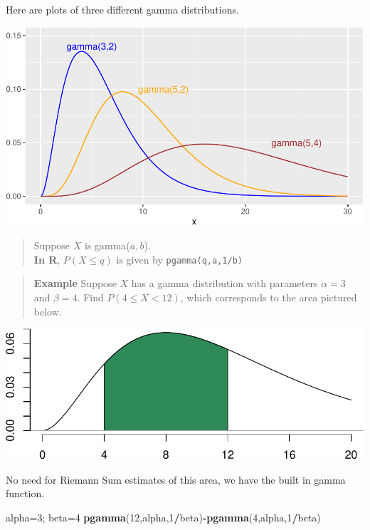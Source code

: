 \documentclass[
]{book}
\newenvironment{Shaded}{\begin{snugshade}}{\end{snugshade}}
\newcommand{\DecValTok}[1]{\textcolor[rgb]{0.00,0.00,0.81}{#1}}
\newcommand{\FunctionTok}[1]{\textcolor[rgb]{0.13,0.29,0.53}{\textbf{#1}}}
\newcommand{\NormalTok}[1]{#1}
\newcommand{\OtherTok}[1]{\textcolor[rgb]{0.56,0.35,0.01}{#1}}
\newcommand{\SpecialCharTok}[1]{\textcolor[rgb]{0.81,0.36,0.00}{\textbf{#1}}}
\theoremstyle{definition}
\theoremstyle{definition}
\theoremstyle{definition}
\theoremstyle{definition}
\theoremstyle{remark}
\begin{document}
Here are plots of three different gamma distributions.

\begin{center}\includegraphics{math340-notes_files/figure-latex/unnamed-chunk-185-1} \end{center}

\begin{quote}
Suppose \(X\) is gamma(\(a,b\)).\\
\textbf{In R}, \(P(X \leq q)\) is given by \texttt{pgamma(q,a,1/b)}
\end{quote}

\begin{quote}
\textbf{Example} Suppose \(X\) has a gamma distribution with parameters \(\alpha=3\) and \(\beta = 4\). Find \(P(4\leq X < 12)\), which corresponds to the area pictured below.
\end{quote}

\begin{center}\includegraphics{math340-notes_files/figure-latex/unnamed-chunk-186-1} \end{center}

No need for Riemann Sum estimates of this area, we have the built in gamma function.

\begin{Shaded}
\begin{Highlighting}[]
\NormalTok{alpha}\OtherTok{=}\DecValTok{3}\NormalTok{; beta}\OtherTok{=}\DecValTok{4}
\FunctionTok{pgamma}\NormalTok{(}\DecValTok{12}\NormalTok{,alpha,}\DecValTok{1}\SpecialCharTok{/}\NormalTok{beta)}\SpecialCharTok{{-}}\FunctionTok{pgamma}\NormalTok{(}\DecValTok{4}\NormalTok{,alpha,}\DecValTok{1}\SpecialCharTok{/}\NormalTok{beta)}
\end{Highlighting}
\end{Shaded}
\end{document}
